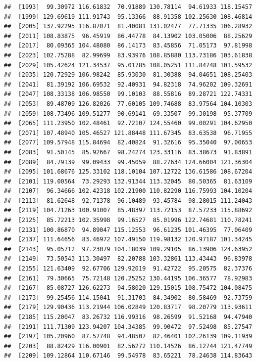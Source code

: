 \documentclass[
]{article}
\begin{document}
\begin{verbatim}
##  [1993]  99.30972 116.61832  70.91889 130.78114  94.61933 118.15457
##  [1999] 129.69619 111.91743  95.13366  88.91358 102.25630 108.46814
##  [2005] 137.92295 116.87071  81.40081 131.02477  77.71335 106.28932
##  [2011] 108.83875  96.45919  86.44778  84.13902 103.05006  88.25629
##  [2017]  80.09365 104.48080  86.14173  83.45856  71.05173  97.81998
##  [2023] 102.75288  82.99699  83.93976 108.85880 113.73186 103.61838
##  [2029] 105.42624 121.34537  95.01785 108.05251 111.84748 101.59532
##  [2035] 120.72929 106.98242  85.93030  81.30388  94.04651 108.25403
##  [2041]  81.39192 106.69532  92.40931  94.82318  74.96202 109.32691
##  [2047] 108.33138 106.98550  99.10103  88.55816  89.28721 122.74331
##  [2053]  89.48709 126.82026  77.60105 109.74688  83.97564 104.10303
##  [2059] 108.73496 109.51277  90.69141  69.33507  99.30198  95.37709
##  [2065] 111.23950 102.48461  92.72107 124.55460  99.00291 104.62950
##  [2071] 107.48940 105.46527 121.88448 111.67345  83.63538  96.71955
##  [2077] 109.57948 115.84694  82.40824  91.32616  95.35040  97.00653
##  [2083]  91.50145  85.92667  98.24274 123.33116  83.38673  91.83891
##  [2089]  84.79139  99.09433  99.45059  88.27634 124.66004 121.36304
##  [2095] 101.68676 125.33102 118.10104 107.12722 136.61586 108.67204
##  [2101] 119.00564  73.29293 132.91344 113.32045  80.50365  81.63109
##  [2107]  96.34666 102.42318 102.21900 110.82290 116.75993 104.10204
##  [2113]  81.62648  92.71378  96.10489  93.45784  98.28015 111.24043
##  [2119] 104.71263 100.91007  85.48397 113.72153  87.57233 115.88692
##  [2125]  85.72213 102.35998  99.16527  85.01996 122.74681 110.78241
##  [2131] 100.86870  94.89047 115.12553  96.61235 101.46395  77.06409
##  [2137] 111.64656  83.46972 107.49150 119.98132 120.97187 101.34245
##  [2143]  95.05712  97.23079 104.18039 109.29105  86.13906 124.63952
##  [2149]  73.50543 113.30497  82.20788 103.32861 113.43443  96.83978
##  [2155] 121.63409  92.67706 129.92019  91.42722  95.20575  82.37376
##  [2161]  79.30665  75.72148 120.25252 130.44195 106.36577  78.92983
##  [2167]  85.08727 126.62273  94.58020 129.15015 108.75472 104.08475
##  [2173]  99.25456 114.15041  91.31703  84.34902  80.58469  92.73759
##  [2179] 129.90436 113.21944 106.02849 120.83717  98.20779 113.93611
##  [2185] 115.20047  83.26732 116.99316  98.26599  91.52168  94.47940
##  [2191] 111.71309 123.94207 104.34385  99.90472  97.52498  85.27547
##  [2197] 105.20960  87.57748  94.48507  82.46401 102.26139 109.11939
##  [2203]  88.82429 116.00901  82.56272 110.14526  86.12744 121.47749
##  [2209] 109.12864 110.67146  99.54978  83.65221  78.24638 114.83643

\end{verbatim}
\end{document}

